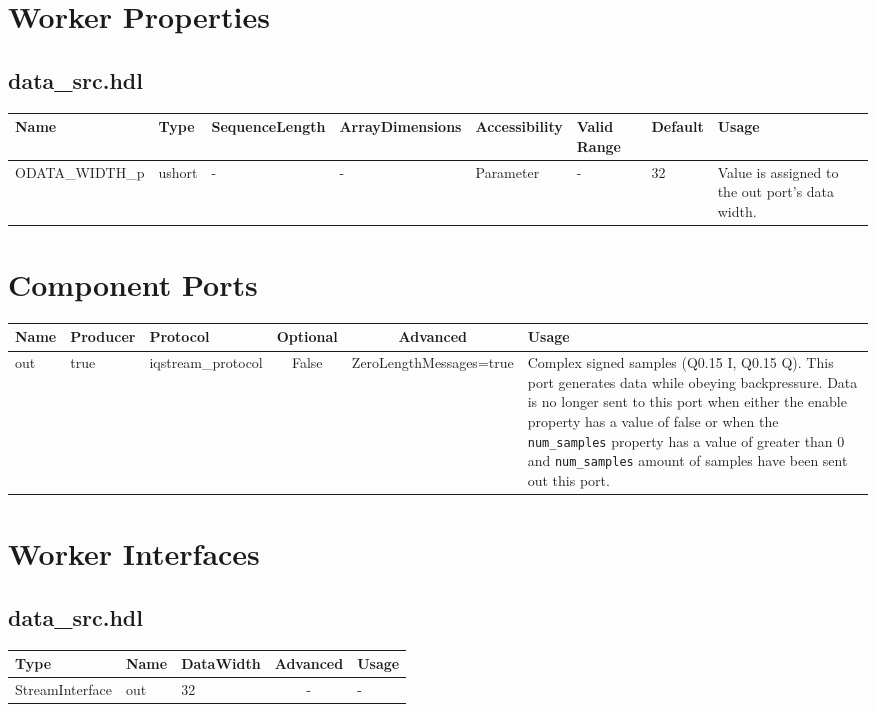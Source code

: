 \documentclass{article}
\def\comp{data\_src}
\begin{document}
\begin{landscape}
	\section*{Worker Properties}
	\subsection*{\comp.hdl}
	\begin{scriptsize}
\begin{longtable}{|p{5.5cm}|p{1.25cm}|p{2cm}|p{2.75cm}|p{1.5cm}|p{1.5cm}|p{1cm}|p{5.25cm}|}
\hline
\rowcolor{blue}
Name                 & Type   & SequenceLength & ArrayDimensions & Accessibility       & Valid Range & Default & Usage
\\
\hline
ODATA\_WIDTH\_p & ushort  & - & - & Parameter & -  &32 & Value is assigned to the out port's data width.
\\
\hline
\end{longtable}

	\end{scriptsize}

	\section*{Component Ports}
	\begin{scriptsize}
\begin{tabular}{|M{2cm}|M{1.5cm}|M{4cm}|c|c|M{9cm}|}
\hline
{}
Name & Producer & Protocol & Optional & Advanced & Usage
\\
\hline
out & true & iqstream\_protocol& False & ZeroLengthMessages=true & Complex signed samples (Q0.15 I, Q0.15 Q). This port generates data while obeying backpressure. Data is no longer sent to this port when either the enable property has a value of false or when the \verb+num_samples+ property has a value of greater than 0 and \verb+num_samples+ amount of samples have been sent out this port.\\
\hline
\end{tabular}
	\end{scriptsize}

	\section*{Worker Interfaces}
	\subsection*{\comp.hdl}
	\begin{scriptsize}
\begin{tabular}{|M{2cm}|M{1.5cm}|M{4cm}|c|M{12cm}|}
\hline
{}
Type & Name & DataWidth & Advanced & Usage
\\
\hline
StreamInterface & out & 32 & - & -\\
\hline
\end{tabular}
	\end{scriptsize}
\end{landscape}
\end{document}
